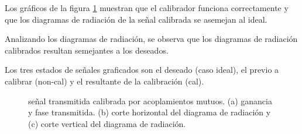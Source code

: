 Los gráficos de la figura \ref{fig:compErrMutual0deg} muestran que el calibrador funciona correctamente y que los diagramas de 
radiación de la señal calibrada se asemejan al ideal. 

Analizando los diagramas de radiación, se observa que los diagramas de radiación calibrados resultan semejantes a los deseados. 

Los tres estados de señales graficados son el deseado (caso ideal), el previo a calibrar (non-cal) y el resultante de la
calibración (cal).
\begin{figure}[H]
	\centering

	\caption{señal transmitida calibrada por acoplamientos mutuos. (a) ganancia y fase transmitida. (b) corte horizontal del 
	diagrama de radiación y (c) corte vertical del diagrama de radiación.}
	\label{fig:compErrMutual0deg}
\end{figure}

